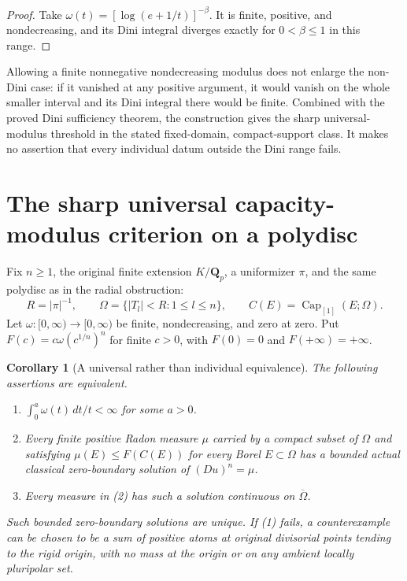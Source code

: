 \documentclass[11pt,a4paper]{article}
\numberwithin{equation}{section}
\newtheorem{corollary}[theorem]{Corollary}
\theoremstyle{definition}
\theoremstyle{remark}
\begin{document}
\begin{proof}
Take $\omega(t)=[\log(e+1/t)]^{-\beta}$. It is finite,
positive, and nondecreasing, and its Dini integral diverges
exactly for $0<\beta\leq1$ in this range.
\end{proof}

Allowing a finite nonnegative nondecreasing modulus does not
enlarge the non-Dini case: if it vanished at any positive
argument, it would vanish on the whole smaller interval and
its Dini integral there would be finite. Combined with the
proved Dini sufficiency theorem, the construction gives the
sharp universal-modulus threshold in the stated fixed-domain,
compact-support class. It makes no assertion that every
individual datum outside the Dini range fails.



\section{The sharp universal capacity-modulus criterion on a polydisc}
\label{sec:r3-universal-modulus-criterion}

Fix $n\geq1$, the original finite extension $K/\mathbf Q_p$, a
uniformizer $\pi$, and the same polydisc as in the radial obstruction:
\[
 R=|\pi|^{-1},\qquad
 \Omega=\{|T_l|<R:1\leq l\leq n\},\qquad
 C(E)=\operatorname{Cap}_{[1]}(E;\Omega).
\]
Let $\omega:[0,\infty)\to[0,\infty)$ be finite, nondecreasing,
and zero at zero. Put $F(c)=c\omega(c^{1/n})^n$ for finite
$c>0$, with $F(0)=0$ and $F(+\infty)=+\infty$.

\begin{corollary}[A universal rather than individual equivalence]
\label{cor:r3-universal-modulus-criterion}
The following assertions are equivalent.
\begin{enumerate}
\item $\int_0^a\omega(t)\,dt/t<\infty$ for some $a>0$.
\item Every finite positive Radon measure $\mu$ carried by a compact
subset of $\Omega$ and satisfying
$\mu(E)\leq F(C(E))$ for every Borel $E\subset\Omega$ has
a bounded actual classical zero-boundary solution of $(Du)^n=\mu$.
\item Every measure in (2) has such a solution continuous on
$\overline\Omega$.
\end{enumerate}
Such bounded zero-boundary solutions are unique. If (1) fails,
a counterexample can be chosen to be a sum of positive atoms at
original divisorial points tending to the rigid origin, with no
mass at the origin or on any ambient locally pluripolar set.
\end{corollary}
\end{document}
